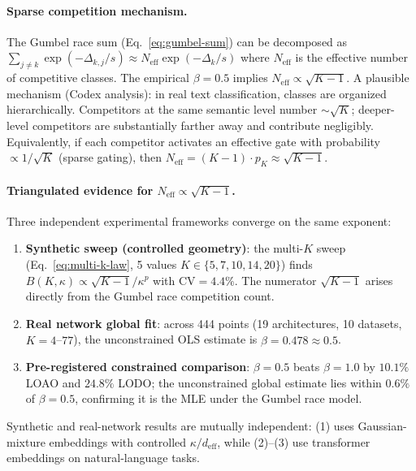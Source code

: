 \documentclass{article}
\begin{document}
\paragraph{Sparse competition mechanism.}
The Gumbel race sum (Eq.~\ref{eq:gumbel-sum}) can be decomposed as
$\sum_{j\neq k}\exp(-\Delta_{k,j}/s) \approx N_\mathrm{eff}\exp(-\Delta_k/s)$
where $N_\mathrm{eff}$ is the effective number of competitive classes.
The empirical $\beta=0.5$ implies $N_\mathrm{eff} \propto \sqrt{K-1}$.
A plausible mechanism (Codex analysis): in real text classification, classes are organized
hierarchically. Competitors at the same semantic level number $\sim\sqrt{K}$; deeper-level
competitors are substantially farther away and contribute negligibly. Equivalently, if each
competitor activates an effective gate with probability $\propto 1/\sqrt{K}$ (sparse gating),
then $N_\mathrm{eff} = (K-1)\cdot p_K \approx \sqrt{K-1}$.
\paragraph{Triangulated evidence for $N_\mathrm{eff}\propto\sqrt{K-1}$.}
Three independent experimental frameworks converge on the same exponent:
\begin{enumerate}[nosep]
\item \textbf{Synthetic sweep (controlled geometry)}: the multi-$K$ sweep
  (Eq.~\ref{eq:multi-k-law}, 5 values $K\in\{5,7,10,14,20\}$) finds
  $B(K,\kappa)\propto\sqrt{K-1}/\kappa^p$ with CV$=4.4\%$.
  The numerator $\sqrt{K-1}$ arises directly from the Gumbel race competition count.
\item \textbf{Real network global fit}: across 444 points (19 architectures, 10 datasets,
  $K=4$--$77$), the unconstrained OLS estimate is $\hat\beta=0.478\approx0.5$.
\item \textbf{Pre-registered constrained comparison}: $\beta=0.5$ beats $\beta=1.0$ by
  $10.1\%$ LOAO and $24.8\%$ LODO; the unconstrained global estimate lies within $0.6\%$
  of $\beta=0.5$, confirming it is the MLE under the Gumbel race model.
\end{enumerate}
Synthetic and real-network results are mutually independent: (1) uses Gaussian-mixture embeddings
with controlled $\kappa/d_\mathrm{eff}$, while (2)--(3) use transformer embeddings on natural-language tasks.
\end{document}
